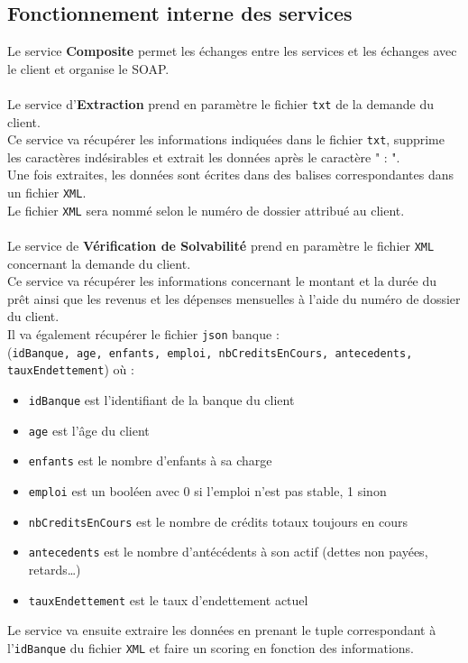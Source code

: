 \documentclass{article}
\begin{document}
	\subsection{Fonctionnement interne des services}
	Le service \textbf{Composite} permet les échanges entre les services et les échanges avec le client et organise le SOAP. \\
	\\
	Le service d’\textbf{Extraction} prend en paramètre le fichier \texttt{txt} de la demande du client.\\
	Ce service va récupérer les informations indiquées dans le fichier \texttt{txt}, supprime les caractères indésirables et extrait les données après le caractère " : ".\\
	Une fois extraites, les données sont écrites dans des balises correspondantes dans un fichier \texttt{XML}. \\
	Le fichier \texttt{XML} sera nommé selon le numéro de dossier attribué au client. \\
	\\
	Le service de \textbf{Vérification de Solvabilité} prend en paramètre le fichier \texttt{XML} concernant la demande du client. \\
	Ce service va récupérer les informations concernant le montant et la durée du prêt ainsi que les revenus et les dépenses mensuelles à l'aide du numéro de dossier du client. \\
	Il va également récupérer le fichier \texttt{json} banque : \\
	(\texttt{idBanque, age, enfants, emploi, nbCreditsEnCours, antecedents, tauxEndettement}) où : 
	\begin{itemize}
		\item \texttt{idBanque} est l’identifiant de la banque du client
		\item \texttt{age} est l’âge du client
		\item \texttt{enfants} est le nombre d’enfants à sa charge
		\item \texttt{emploi} est un booléen avec 0 si l’emploi n’est pas stable, 1 sinon
		\item \texttt{nbCreditsEnCours} est le nombre de crédits totaux toujours en cours
		\item \texttt{antecedents} est le nombre d’antécédents à son actif (dettes non payées, retards…) 
		\item \texttt{tauxEndettement} est le taux d’endettement actuel
	\end{itemize}
	Le service va ensuite extraire les données en prenant le tuple correspondant à l’\texttt{idBanque} du fichier \texttt{XML} et faire un scoring en fonction des informations. \\
\end{document}
